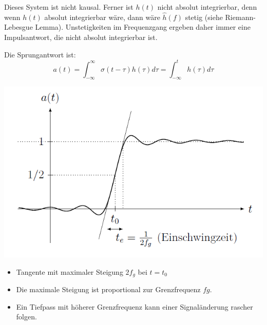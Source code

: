 Dieses System ist nicht kausal. Ferner ist $h(t)$ nicht absolut integrierbar, denn wenn $h(t)$ absolut integrierbar wäre, dann wäre $\hat{h}(f)$ stetig (siehe Riemann-Lebesgue Lemma). Unstetigkeiten im Frequenzgang ergeben daher immer eine Impulsantwort,
die nicht absolut integrierbar ist.

Die Sprungantwort ist:
\begin{equation*}
    a(t) = \int_{-\infty}^{\infty}\sigma(t-\tau)h(\tau)d\tau=\int_{-\infty}^{t}h(\tau)d\tau
\end{equation*}

\begin{center}
    \includegraphics*[width=0.9\linewidth]{../img/7.3.1_stepResponse.png}
\end{center}

\begin{itemize}
    \item Tangente mit maximaler Steigung $2f_g$ bei $t=t_0$
    \item Die maximale Steigung ist proportional zur Grenzfrequenz $fg$.
    \item Ein Tiefpass mit höherer Grenzfrequenz kann einer Signaländerung rascher folgen.
\end{itemize}


